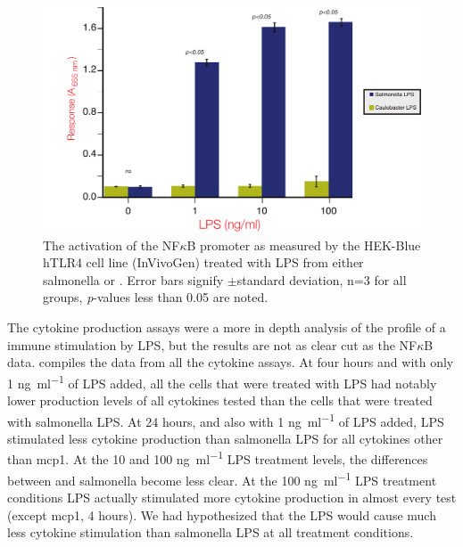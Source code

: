 \begin{figure}[htb]
  \begin{center}
    \includegraphics[width=\textwidth]{lps_chapter/img/NFkBAssay.pdf}
  \end{center}
  \caption[NF$\kappa$B Assay for cellular activation by \ac{LPS}]{
    The activation of the NF$\kappa$B promoter as measured by the HEK-Blue hTLR4\texttrademark{} cell line (InVivoGen) treated with \ac{LPS} from either \ac{salmonella} or \caulobacter{}. Error bars signify $\pm{}$standard deviation, n=3 for all groups, \textit{p}-values less than 0.05 are noted.  }
  \label{fig:nfkbassay}
\end{figure}    

The cytokine production assays were a more in depth analysis of the profile of a immune stimulation by \caulobacter{} \ac{LPS}, but the results are not as clear cut as the NF$\kappa$B data.  compiles the data from all the cytokine assays. At four hours and with only 1 \si{\nano\gram\per\milli\litre} of \ac{LPS} added, all the cells that were treated with \caulobacter{} \ac{LPS} had notably lower production levels of all cytokines tested than the cells that were treated with \ac{salmonella} \ac{LPS}. At 24 hours, and also with 1 \si{\nano\gram\per\milli\litre} of \ac{LPS} added, \caulobacter{} \ac{LPS} stimulated less cytokine production than \ac{salmonella} \ac{LPS} for all cytokines other than \ac{mcp1}. At the 10 and 100 \si{\nano\gram\per\milli\litre} \ac{LPS} treatment levels, the differences between \caulobacter{} and \ac{salmonella} become less clear. At the 100 \si{\nano\gram\per\milli\litre} \ac{LPS} treatment conditions \caulobacter{} \ac{LPS} actually stimulated more cytokine production in almost every test (except \ac{mcp1}, 4 hours). We had hypothesized that the \caulobacter{}  \ac{LPS} would cause much less cytokine stimulation than \ac{salmonella} \ac{LPS} at all treatment conditions. 

